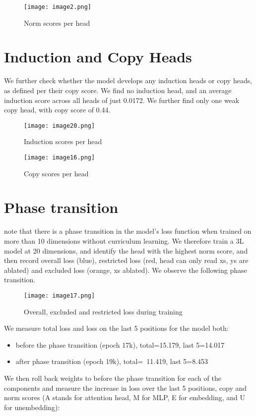 \documentclass{article}
\begin{document}
\begin{figure}[htbp]
\centering
\texttt{[image: image2.png]}
\caption{Norm scores per head}
\end{figure}

\section{Induction and Copy Heads}
We further check whether the model develops any induction heads \citep{olsson_2022_incontext} or copy heads, as defined per their copy score. We find no induction head, and an average induction score across all heads of just 0.0172. We further find only one weak copy head, with copy score of 0.44.
\begin{figure}[htbp]
\centering
\texttt{[image: image20.png]}
\caption{Induction scores per head}
\end{figure}

\begin{figure}[htbp]
\centering
\texttt{[image: image16.png]}
\caption{Copy scores per head}
\end{figure}

\newpage

\section{Phase transition}
\citep{garg_2023_what} note that there is a phase transition in the model’s loss function when trained on more than 10 dimensions without curriculum learning. We therefore train a 3L model at 20 dimensions, and identify the head with the highest norm score, and then record overall loss (blue), restricted loss (red, head can only read xs, ys are ablated) and excluded loss (orange, xs ablated). We observe the following phase transition.

\begin{figure}[htbp]
\centering
\texttt{[image: image17.png]}
\caption{Overall, excluded and restricted loss during training}
\end{figure}

We measure total loss and loss on the last 5 positions for the model both:
\begin{itemize}
    \item before the phase transition (epoch 17k), total=15.179, last 5=14.017
    \item after phase transition (epoch 19k), total=~11.419, last 5=8.453
\end{itemize}
We then roll back weights to before the phase transition for each of the components and measure the increase in loss over the last 5 positions, copy and norm scores (A stands for attention head, M for MLP, E for embedding, and U for unembedding):
\end{document}
